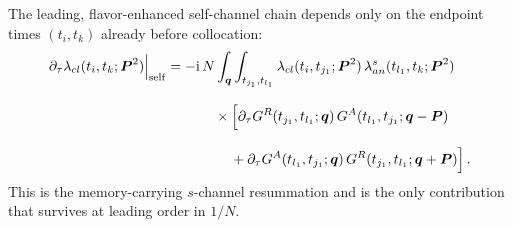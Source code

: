 \documentclass[reprint,english,superscriptaddress,preprintnumbers,amsmath,amssymb,aps,prd]{revtex4-1}
\begin{document}
The leading, flavor-enhanced self-channel chain depends only on the endpoint times $(t_i,t_k)$ already before collocation:
\begin{align}
    \partial_{\tau}\lambda_{cl}(t_i,t_k;\boldsymbol{P}^{2})\Big|_{\mathrm{self}}
    &=-\mathrm{i}\,N\int_{\boldsymbol{q}}\int_{t_{j_1},t_{l_1}}\lambda_{cl}(t_i,t_{j_1};\boldsymbol{P}^{2})\,\lambda_{an}^{s}(t_{l_1},t_k;\boldsymbol{P}^{2})\nonumber\\[2ex]
    &\hspace{1.2cm}\times\Big[\partial_{\tau}G^{R}(t_{j_1},t_{l_1};\boldsymbol{q})\,G^{A}(t_{l_1},t_{j_1};\boldsymbol{q}-\boldsymbol{P})\nonumber\\[2ex]
    &\hspace{1.6cm}+\partial_{\tau}G^{A}(t_{l_1},t_{j_1};\boldsymbol{q})\,G^{R}(t_{j_1},t_{l_1};\boldsymbol{q}+\boldsymbol{P})\Big]\,.
    \label{eq:lamcl-s-self}
\end{align}
This is the memory-carrying $s$-channel resummation and is the only contribution that survives at leading order in $1/N$.
\end{document}
